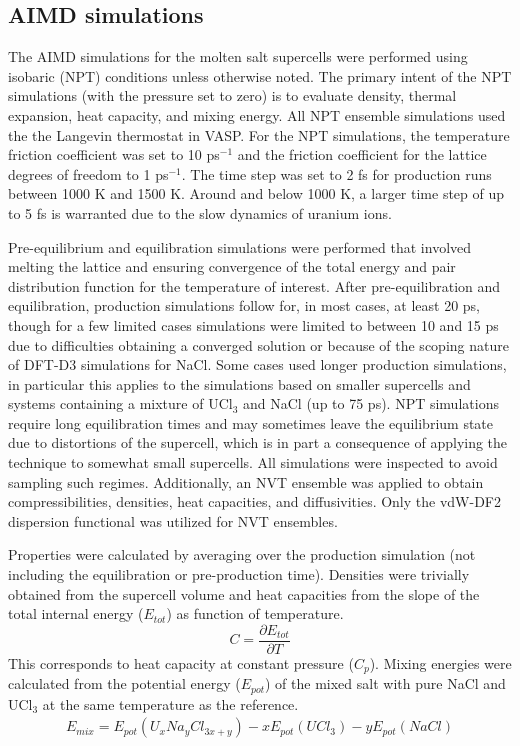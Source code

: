 \documentclass[preprint,3p,10pt,onecolumn,number,sort&compress]{elsarticle}
\begin{document}
{%

\subsection{AIMD simulations}
The AIMD simulations for the molten salt supercells were performed using isobaric (NPT) conditions unless otherwise noted. The primary intent of the NPT simulations (with the pressure set to zero) is to evaluate density, thermal expansion, heat capacity, and mixing energy. All NPT ensemble simulations used the the Langevin thermostat in VASP. For the NPT simulations, the temperature friction coefficient was set to 10 ps$^{-1}$ and the friction coefficient for the lattice degrees of freedom to 1 ps$^{-1}$. The time step was set to 2 fs for production runs between 1000 K and 1500 K. Around and below 1000 K, a larger time step of up to 5 fs is warranted due to the slow dynamics of uranium ions.

Pre-equilibrium and equilibration simulations were performed that involved melting the lattice and ensuring convergence of the total energy and pair distribution function for the temperature of interest. After pre-equilibration and equilibration, production simulations follow for, in most cases, at least 20 ps, though for a few limited cases simulations were limited to between 10 and 15 ps due to difficulties obtaining a converged solution or because of the scoping nature of DFT-D3 simulations for NaCl. Some cases used longer production simulations, in particular this applies to the simulations based on smaller supercells and systems containing a mixture of UCl$_3$ and NaCl (up to 75 ps). NPT simulations require long equilibration times and may sometimes leave the equilibrium state due to distortions of the supercell, which is in part a consequence of applying the technique to somewhat small supercells. All simulations were inspected to avoid sampling such regimes. Additionally, an NVT ensemble was applied to obtain compressibilities, densities, heat capacities, and diffusivities. Only the vdW-DF2 dispersion functional was utilized for NVT ensembles. 

Properties were calculated by averaging over the production simulation (not including the equilibration or pre-production time). Densities were trivially obtained from the supercell volume and heat capacities from the slope of the total internal energy ($E_{tot}$) as function of temperature. 
\begin{equation}
\label{eq:cp}
C=\frac{\partial E_{tot}}{\partial T}
\end{equation}
This corresponds to heat capacity at constant pressure ($C_p$). Mixing energies were calculated from the potential energy ($E_{pot}$) of the mixed salt with pure NaCl and UCl$_3$ at the same temperature as the reference. 
\begin{equation}
\begin{split}
E_{mix}=E_{pot}(U_xNa_yCl_{3x+y})-xE_{pot}(UCl_3)-yE_{pot}(NaCl)
\end{split}
\end{equation}

}
\end{document}
